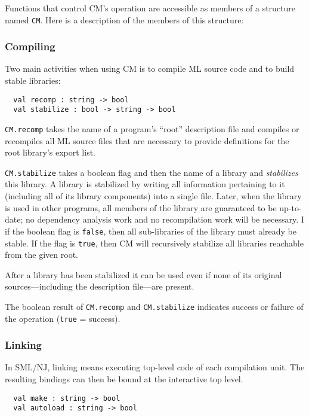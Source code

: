 \documentclass{article}
\begin{document}
Functions that control CM's operation are accessible as members of a
structure named {\tt CM}.  Here is a description of the members of
this structure:

\subsubsection*{Compiling}

Two main activities when using CM is to compile ML source code and to
build stable libraries:

\begin{verbatim}
  val recomp : string -> bool
  val stabilize : bool -> string -> bool
\end{verbatim}

{\tt CM.recomp} takes the name of a program's ``root'' description
file and compiles or recompiles all ML source files that are necessary
to provide definitions for the root library's export list.

{\tt CM.stabilize} takes a boolean flag and then the name of a library
and {\em stabilizes} this library.  A library is stabilized by writing
all information pertaining to it (including all of its library
components) into a single file.  Later, when the library is used in
other programs, all members of the library are guaranteed to be
up-to-date; no dependency analysis work and no recompilation work will
be necessary.  I if the boolean flag is {\tt false}, then all
sub-libraries of the library must already be stable.  If the flag is
{\tt true}, then CM will recursively stabilize all libraries reachable
from the given root.

After a library has been stabilized it can be used even if none of its
original sources---including the description file---are present.

The boolean result of {\tt CM.recomp} and {\tt CM.stabilize} indicates
success or failure of the operation ({\tt true} = success).

\subsubsection*{Linking}

In SML/NJ, linking means executing top-level code of each compilation
unit.  The resulting bindings can then be bound at the interactive top
level.

\begin{verbatim}
  val make : string -> bool
  val autoload : string -> bool
\end{verbatim}
\end{document}

